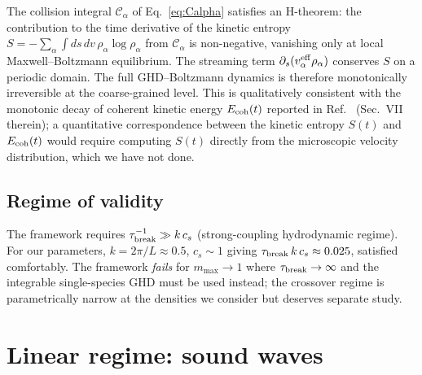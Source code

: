 \documentclass[aps,pre,twocolumn,superscriptaddress,longbibliography,floatfix]{revtex4-2}
\begin{document}
The collision integral $\mathcal{C}_\alpha$ of
Eq.~\eqref{eq:Calpha} satisfies an H-theorem: the contribution
to the time derivative of the kinetic entropy
$S = -\sum_\alpha\int\!ds\,dv\,\rho_\alpha\log\rho_\alpha$
from $\mathcal{C}_\alpha$ is non-negative, vanishing only at
local Maxwell--Boltzmann equilibrium. The streaming term
$\partial_s(v^{\rm eff}_\alpha\rho_\alpha)$ conserves $S$ on a
periodic domain. The full GHD--Boltzmann dynamics is therefore
monotonically irreversible at the coarse-grained level. This is
qualitatively consistent with the monotonic decay of coherent
kinetic energy $E_{\rm coh}(t)$ reported in Ref.~\cite{PaperIII}
(Sec.~VII therein); a quantitative correspondence between the
kinetic entropy $S(t)$ and $E_{\rm coh}(t)$ would require
computing $S(t)$ directly from the microscopic velocity
distribution, which we have not done.

\subsection{Regime of validity}\label{sec:validity}

The framework requires $\tau_{\rm break}^{-1} \gg k\,c_s$
(strong-coupling hydrodynamic regime). For our parameters,
$k=2\pi/L\approx 0.5$, $c_s\sim 1$ giving
$\tau_{\rm break}\,k\,c_s\approx 0.025$, satisfied
comfortably. The framework \emph{fails} for $m_{\max}\to 1$
where $\tau_{\rm break}\to\infty$ and the integrable
single-species GHD must be used instead; the crossover regime
is parametrically narrow at the densities we consider but
deserves separate study.

\section{Linear regime: sound waves}\label{sec:linear}
\end{document}
